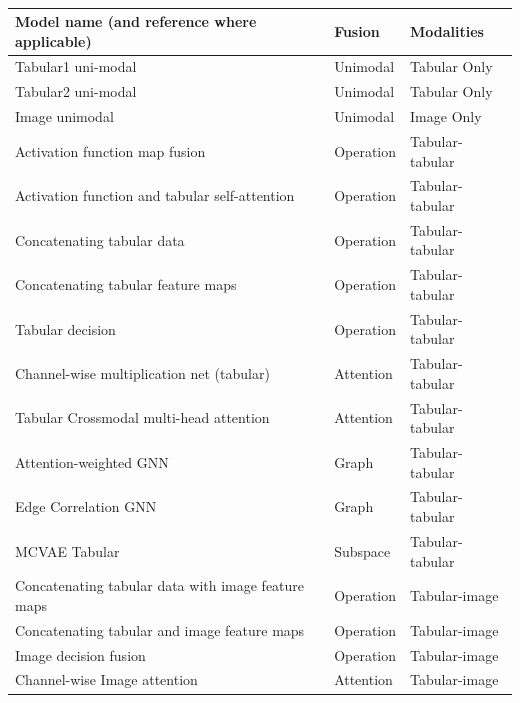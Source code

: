 \begin{table}[!ht]
    \caption{}
    \label{}
    \centering
    \begin{tabular}{|p{8cm}ll|}
        \hline
        \textbf{Model name (and reference where applicable)} & \textbf{Fusion} & \textbf{Modalities} \\ \hline
        Tabular1 uni-modal & Unimodal & Tabular Only \\ \hline
        Tabular2 uni-modal & Unimodal & Tabular Only \\ \hline
        Image unimodal & Unimodal & Image Only \\ \hline
        Activation function map fusion \cite{chenMDFNetApplicationMultimodal2023} & Operation & Tabular-tabular \\ \hline 
        Activation function and tabular self-attention \cite{chenMDFNetApplicationMultimodal2023} & Operation & Tabular-tabular \\ \hline 
        Concatenating tabular data & Operation & Tabular-tabular \\ \hline 
        Concatenating tabular feature maps \cite{gaoReducingUncertaintyCancer2022} & Operation & Tabular-tabular \\ \hline 
        Tabular decision & Operation & Tabular-tabular \\ \hline 
        Channel-wise multiplication net (tabular) \cite{duanmuPredictionPathologicalComplete2020}  & Attention & Tabular-tabular \\ \hline 
        Tabular Crossmodal multi-head attention \cite{golovanevskyMultimodalAttentionbasedDeep2022}  & Attention & Tabular-tabular \\ \hline 
        Attention-weighted GNN \cite{bintsiMultimodalBrainAge2023} & Graph & Tabular-tabular \\ \hline 
        Edge Correlation GNN & Graph & Tabular-tabular \\ \hline 
        MCVAE Tabular \cite{antelmiSparseMultiChannelVariational2019}  & Subspace & Tabular-tabular \\ \hline 
        Concatenating tabular data with image feature maps \cite{liFusingMetadataDermoscopy2020}  & Operation & Tabular-image \\ \hline 
        Concatenating tabular and image feature maps \cite{gaoReducingUncertaintyCancer2022} & Operation & Tabular-image \\ \hline 
        Image decision fusion & Operation & Tabular-image \\ \hline 
        Channel-wise Image attention \cite{duanmuPredictionPathologicalComplete2020} & Attention & Tabular-image \\ \hline 

\end{tabular}
\end{table}
